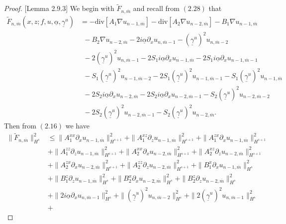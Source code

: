 \begin{proof}{[Lemma 2.9.3]} We begin with $\tilde{F}_{n,\overline{m}}$ and recall from $(2.28)$ that
\begin{align}\tilde{F}_{n,\overline{m}}\left(x,z;f,u,\underline{\alpha},\underline{\gamma}^u\right)&=-\text{div}[A_1\nabla u_{n-1,\overline{m}}]-\text{div}[A_2\nabla u_{n-2,\overline{m}}]-B_1\nabla u_{n-1,\overline{m}} \nonumber
\\&~~- B_2\nabla u_{n-2,\overline{m}}-2i\underline{\alpha}\partial_xu_{n,\overline{m}-1}-(\underline{\gamma}^u)^2u_{n,\overline{m}-2}\nonumber
\\&~~-2(\underline{\gamma}^u)^2u_{n,\overline{m}-1}-2S_1i\underline{\alpha}\partial_xu_{n-1,\overline{m}}-2S_1i\underline{\alpha}\partial_xu_{n-1,\overline{m}-1}
\\&~~-S_1(\underline{\gamma}^u)^2u_{n-1,\overline{m}-2}-2S_1(\underline{\gamma}^u)^2u_{n-1,\overline{m}-1}-S_1(\underline{\gamma}^u)^2u_{n-1,\overline{m}}\nonumber
\\&~~-2S_2i\underline{\alpha}\partial_xu_{n-2,\overline{m}}-2S_2i\underline{\alpha}\partial_xu_{n-2,\overline{m}-1}-S_2(\underline{\gamma}^u)^2u_{n-2,\overline{m}-2}\nonumber
\\&~~-2S_2(\underline{\gamma}^u)^2u_{n-2,\overline{m}-1}-S_2(\underline{\gamma}^u)^2u_{n-2,\overline{m}}.\nonumber\end{align}
Then from $(2.16)$ we have
\begin{align*}
\|\tilde{F}_{n,\overline{m}}\|_{H^{s}}^2&\le \|A_1^{xx}\partial_x u_{n-1,\overline{m}}\|_{H^{s+1}}^2 + \|A_1^{xz}\partial_z u_{n-1,\overline{m}}\|_{H^{s+1}}^2 + \|A_1^{zx}\partial_x u_{n-1,\overline{m}}\|_{H^{s+1}}^2 \\&+
\|A_1^{zz}\partial_z u_{n-1,\overline{m}}\|_{H^{s+1}}^2 + \|A_2^{xx}\partial_x u_{n-2,\overline{m}}\|_{H^{s+1}}^2 + \|A_2^{xz}\partial_z u_{n-2,\overline{m}}\|_{H^{s+1}}^2 \\&+
\|A_2^{zx}\partial_x u_{n-2,\overline{m}}\|_{H^{s+1}}^2 + \|A_2^{zz}\partial_z u_{n-2,\overline{m}}\|_{H^{s+1}}^2 + \|B_1^{x}\partial_x u_{n-1,\overline{m}}\|_{H^{s}}^2 \\&+
\|B_1^{z}\partial_z u_{n-1,\overline{m}}\|_{H^{s}}^2 +
\|B_2^{x}\partial_x u_{n-2,\overline{m}}\|_{H^{s}}^2 +
\|B_2^{z}\partial_z u_{n-2,\overline{m}}\|_{H^{s}}^2 \\&+
\|2i\underline{\alpha}\partial_xu_{n,\overline{m}-1}\|_{H^{s}}^2 +
\|(\underline{\gamma}^u)^2u_{n,\overline{m}-2}\|_{H^{s}}^2 +
\|2(\underline{\gamma}^u)^2u_{n,\overline{m}-1}\|_{H^{s}}^2 \\&+

\end{align*}
\end{proof}
